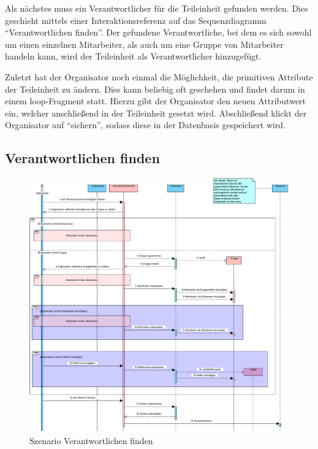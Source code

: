 Als nächstes muss ein Verantwortlicher für die Teileinheit gefunden werden. Dies geschieht mittels einer Interaktionsreferenz auf das Sequenzdiagramm \enquote{Verantwortlichen finden}. Der gefundene Verantwortliche, bei dem es sich sowohl um einen einzelnen Mitarbeiter, als auch um eine Gruppe von Mitarbeiter handeln kann, wird der Teileinheit als Verantwortlicher hinzugefügt.

Zuletzt hat der Organisator noch einmal die Möglichkeit, die primitiven Attribute der Teileinheit zu ändern. Dies kann beliebig oft geschehen und findet darum in einem loop-Fragment statt. Hierzu gibt der Organisator den neuen Attributwert ein, welcher anschließend in der Teileinheit gesetzt wird.
Abschließend klickt der Organisator auf \enquote{sichern}, sodass diese in der Datenbasis gespeichert wird.

\FloatBarrier

\subsection{Verantwortlichen finden}

\begin{figure}[ht!]
    \centering
    \includegraphics[width=0.98\columnwidth]{Bilder/seq_Verantwortlichen_finden.pdf}
    \caption{Szenario Verantwortlichen finden}
    \label{seq:verantwortlichen-finden}
\end{figure}

